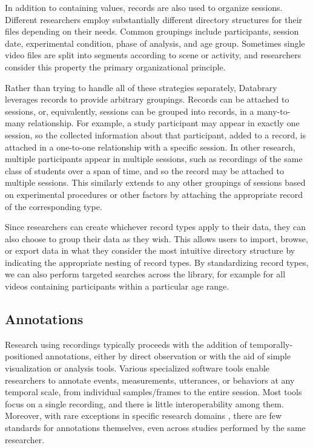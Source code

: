 \documentclass{sig-alternate}
\begin{document}
In addition to containing values, records are also used to organize sessions.
Different researchers employ substantially different directory structures for their files depending on their needs.
Common groupings include participants, session date, experimental condition, phase of analysis, and age group.
Sometimes single video files are split into segments according to scene or activity, and researchers consider this property the primary organizational principle.

Rather than trying to handle all of these strategies separately, Databrary leverages records to provide arbitrary groupings.
Records can be attached to sessions, or, equivalently, sessions can be grouped into records, in a many-to-many relationship.
For example, a study participant may appear in exactly one session, so the collected information about that participant, added to a record, is attached in a one-to-one relationship with a specific session.
In other research, multiple participants appear in multiple sessions, such as recordings of the same class of students over a span of time, and so the record may be attached to multiple sessions.
This similarly extends to any other groupings of sessions based on experimental procedures or other factors by attaching the appropriate record of the corresponding type.

Since researchers can create whichever record types apply to their data, they can also choose to group their data as they wish.
This allows users to import, browse, or export data in what they consider the most intuitive directory structure by indicating the appropriate nesting of record types.
By standardizing record types, we can also perform targeted searches across the library, for example for all videos containing participants within a particular age range.

\subsection{Annotations}

Research using recordings typically proceeds with the addition of temporally-positioned annotations, either by direct observation or with the aid of simple visualization or analysis tools.
Various specialized software tools enable researchers to annotate events, measurements, utterances, or behaviors at any temporal scale, from individual samples/frames to the entire session.
Most tools focus on a single recording, and there is little interoperability among them.
Moreover, with rare exceptions in specific research domains \cite{MacWhinney2001}, there are few standards for annotations themselves, even across studies performed by the same researcher. 
\end{document}
